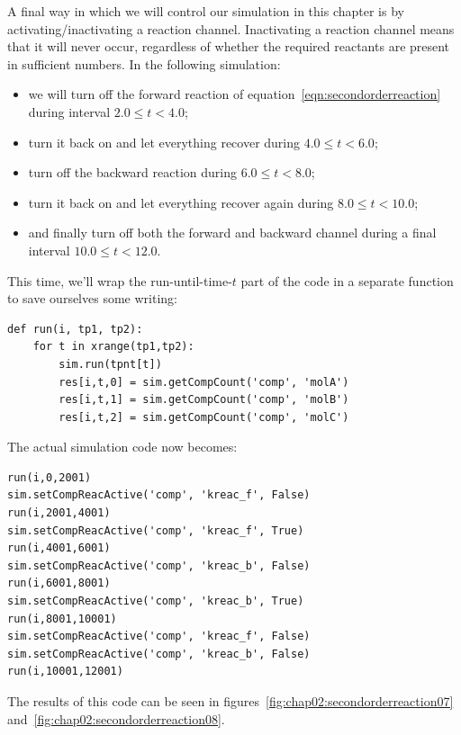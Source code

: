 \documentclass[a4paper,12pt]{book}
\begin{document}
A final way in which we will control our simulation in this chapter is by activating/inactivating a reaction channel. Inactivating a reaction channel means that it will never occur, regardless of whether the required reactants are present in sufficient numbers. In the following simulation: 
\begin{itemize}
\item we will turn off the forward reaction of equation~\ref{eqn:secondorderreaction} during interval $2.0 \leq t < 4.0$;
\item turn it back on and let everything recover during $4.0 \leq t < 6.0$;
\item turn off the backward reaction during $6.0 \leq t < 8.0$; 
\item turn it back on and let everything recover again during $8.0 \leq t < 10.0$;
\item and finally turn off both the forward and backward channel during a final interval $10.0 \leq t < 12.0$.
\end{itemize}
This time, we'll wrap the run-until-time-$t$ part of the code in a separate function to save ourselves some writing:
\begin{verbatim}
def run(i, tp1, tp2):
    for t in xrange(tp1,tp2):
        sim.run(tpnt[t])
        res[i,t,0] = sim.getCompCount('comp', 'molA')
        res[i,t,1] = sim.getCompCount('comp', 'molB')
        res[i,t,2] = sim.getCompCount('comp', 'molC')
\end{verbatim} 

The actual simulation code now becomes:
\begin{verbatim}
run(i,0,2001)
sim.setCompReacActive('comp', 'kreac_f', False)
run(i,2001,4001)
sim.setCompReacActive('comp', 'kreac_f', True)
run(i,4001,6001)
sim.setCompReacActive('comp', 'kreac_b', False)
run(i,6001,8001)
sim.setCompReacActive('comp', 'kreac_b', True)
run(i,8001,10001)
sim.setCompReacActive('comp', 'kreac_f', False)
sim.setCompReacActive('comp', 'kreac_b', False)
run(i,10001,12001)
\end{verbatim}
The results of this code can be seen in figures~\ref{fig:chap02:secondorderreaction07} and~\ref{fig:chap02:secondorderreaction08}.
\end{document}
